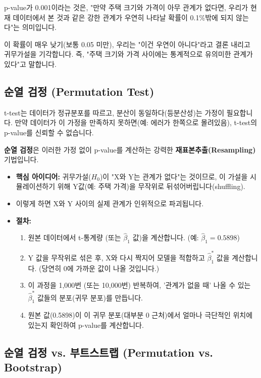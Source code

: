 \documentclass[11pt,a4paper]{book}
\theoremstyle{definition}
\begin{document}
\begin{examplebox}[title=p-value의 직관적 해석]
    p-value가 0.001이라는 것은, "만약 주택 크기와 가격이 아무 관계가 없다면, 우리가 현재 데이터에서 본 것과 같은 강한 관계가 우연히 나타날 확률이 0.1\%밖에 되지 않는다"는 의미입니다.

    이 확률이 매우 낮기(보통 0.05 미만), 우리는 "이건 우연이 아니다"라고 결론 내리고 귀무가설을 기각합니다.
    즉, "주택 크기와 가격 사이에는 통계적으로 유의미한 관계가 있다"고 말합니다.
\end{examplebox}

\subsection{순열 검정 (Permutation Test)}

t-test는 데이터가 정규분포를 따르고, 분산이 동일하다(등분산성)는 가정이 필요합니다. 만약 데이터가 이 가정을 만족하지 못하면(예: 에러가 한쪽으로 몰려있음), t-test의 p-value를 신뢰할 수 없습니다.

\textbf{순열 검정}은 이러한 가정 없이 p-value를 계산하는 강력한 \textbf{재표본추출(Resampling)} 기법입니다.

\begin{itemize}
    \item \textbf{핵심 아이디어:} 귀무가설($H_0$)이 "X와 Y는 관계가 없다"는 것이므로, 이 가설을 시뮬레이션하기 위해 Y값(예: 주택 가격)을 무작위로 뒤섞어버립니다(shuffling).
    \item 이렇게 하면 X와 Y 사이의 실제 관계가 인위적으로 파괴됩니다.
    \item \textbf{절차:}
    \begin{enumerate}
        \item 원본 데이터에서 t-통계량 (또는 $\hat{\beta}_1$ 값)을 계산합니다. (예: $\hat{\beta}_1 = 0.5898$)
        \item Y 값을 무작위로 섞은 후, X와 다시 짝지어 모델을 적합하고 $\hat{\beta}_1^*$ 값을 계산합니다. (당연히 0에 가까운 값이 나올 것입니다.)
        \item 이 과정을 1,000번 (또는 10,000번) 반복하여, '관계가 없을 때' 나올 수 있는 $\hat{\beta}_1^*$ 값들의 분포(귀무 분포)를 만듭니다.
        \item 원본 값(0.5898)이 이 귀무 분포(대부분 0 근처)에서 얼마나 극단적인 위치에 있는지 확인하여 p-value를 계산합니다.
    \end{enumerate}
\end{itemize}

\subsection{순열 검정 vs. 부트스트랩 (Permutation vs. Bootstrap)}
\end{document}
